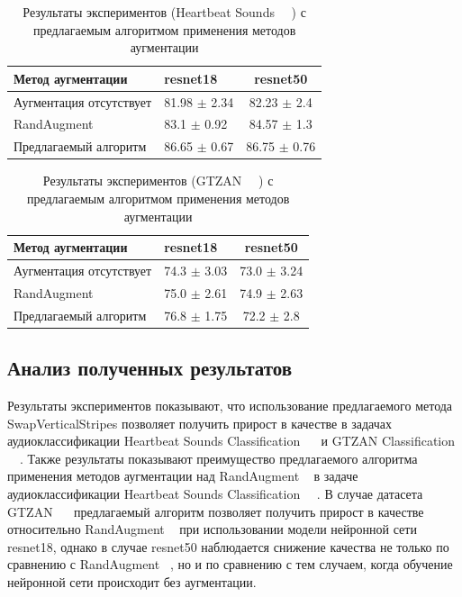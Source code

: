 \documentclass[12pt, fleqn]{article}
\begin{document}
\begin{table}[ht!]
    \centering
	\begin{tabular}{| l | l | c |}
    	\hline
	    Метод аугментации & resnet18 & resnet50 \\ \hline
	    Аугментация отсутствует  & 81.98 $\pm$ 2.34 & 82.23 $\pm$ 2.4 \\ \hline
	    RandAugment ~\cite{RandAugment} & 83.1 $\pm$ 0.92 & 84.57 $\pm$ 1.3 \\ \hline
	    Предлагаемый алгоритм & 86.65 $\pm$ 0.67 & 86.75 $\pm$ 0.76 \\ \hline
	\end{tabular}
	\caption{Результаты экспериментов (Heartbeat Sounds ~\cite{HeartbeatSoundsArticle}~\cite{HeartbeatSoundsKaggle}) с предлагаемым алгоритмом применения методов аугментации}
	\label{table:lukianov_pavel_t3}
\end{table}

\begin{table}[ht!]
    \centering
	\begin{tabular}{| l | l | c |}
    	\hline
	    Метод аугментации & resnet18 & resnet50 \\ \hline
	    Аугментация отсутствует  & 74.3 $\pm$ 3.03 & 73.0 $\pm$ 3.24 \\ \hline
	    RandAugment ~\cite{RandAugment} & 75.0 $\pm$ 2.61 & 74.9 $\pm$ 2.63 \\ \hline
	    Предлагаемый алгоритм & 76.8 $\pm$ 1.75 & 72.2 $\pm$ 2.8 \\ \hline
	\end{tabular}
	\caption{Результаты экспериментов (GTZAN ~\cite{GTZAN_Article}~\cite{GTZAN_kaggle}) с предлагаемым алгоритмом применения методов аугментации}
	\label{table:lukianov_pavel_t4}
\end{table}

\newpage
\subsection{Анализ полученных результатов}

Результаты экспериментов показывают, что использование предлагаемого метода SwapVerticalStripes позволяет получить прирост в качестве в задачах аудиоклассификации Heartbeat Sounds Classification ~\cite{HeartbeatSoundsArticle}~\cite{HeartbeatSoundsKaggle} и GTZAN Classification ~\cite{GTZAN_Article}~\cite{GTZAN_kaggle}. Также результаты показывают преимущество предлагаемого алгоритма применения методов аугментации над RandAugment ~\cite{RandAugment} в задаче аудиоклассификации Heartbeat Sounds Classification ~\cite{HeartbeatSoundsArticle}~\cite{HeartbeatSoundsKaggle}. В случае датасета GTZAN ~\cite{GTZAN_Article}~\cite{GTZAN_kaggle} предлагаемый алгоритм позволяет получить прирост в качестве относительно RandAugment ~\cite{RandAugment} при использовании модели нейронной сети resnet18, однако в случае resnet50 наблюдается снижение качества не только по сравнению с RandAugment ~\cite{RandAugment}, но и по сравнению с тем случаем, когда обучение нейронной сети происходит без аугментации.
\end{document}
